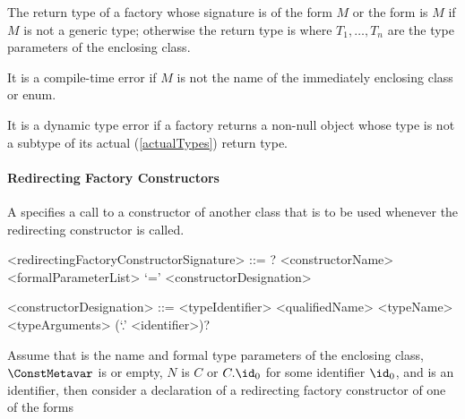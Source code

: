 \documentclass[makeidx]{article}
\begin{document}
\LMHash{}%
The return type of a factory whose signature is of
the form \FACTORY{} $M$ or
the form \FACTORY{} 
is $M$ if $M$ is not a generic type;
otherwise the return type is
where $T_1, \ldots, T_n$ are the type parameters of the enclosing class.

\LMHash{}%
It is a compile-time error if $M$ is not the name of
the immediately enclosing class or enum.

\LMHash{}%
It is a dynamic type error if a factory returns a non-null object
whose type is not a subtype of its actual
(\ref{actualTypes})
return type.




\paragraph{Redirecting Factory Constructors}

\LMHash{}%
A 
specifies a call to a constructor of another class that is to be used
whenever the redirecting constructor is called.

\begin{grammar}
<redirectingFactoryConstructorSignature> ::= \gnewline{}
  \CONST? \FACTORY{} <constructorName> <formalParameterList> `=' \gnewline{}
  <constructorDesignation>

<constructorDesignation> ::= <typeIdentifier>
  \alt <qualifiedName>
  \alt <typeName> <typeArguments> (`.' <identifier>)?
\end{grammar}

Assume that
%
is the name and formal type parameters of the enclosing class,
%
$\ConstMetavar$ is \CONST{} or empty,
$N$ is $C$ or $C.\id_0$ for some identifier $\id_0$,
and \DefineSymbol{\id} is an identifier,
then consider a declaration of a redirecting factory constructor
 of one of the forms
\end{document}
